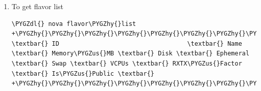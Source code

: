 \documentclass[letterpaper,10pt,english]{sphinxmanual}
\def\PYGZus{\char`\_}
\def\PYGZdl{\char`\$}
\def\PYGZhy{\char`\-}
\begin{document}
\begin{enumerate}
\item {} 
To get flavor list

\begin{Verbatim}[commandchars=\\\{\}]
\PYGZdl{} nova flavor\PYGZhy{}list
+\PYGZhy{}\PYGZhy{}\PYGZhy{}\PYGZhy{}\PYGZhy{}\PYGZhy{}\PYGZhy{}\PYGZhy{}\PYGZhy{}\PYGZhy{}\PYGZhy{}\PYGZhy{}\PYGZhy{}\PYGZhy{}\PYGZhy{}\PYGZhy{}\PYGZhy{}\PYGZhy{}\PYGZhy{}\PYGZhy{}\PYGZhy{}\PYGZhy{}\PYGZhy{}\PYGZhy{}\PYGZhy{}\PYGZhy{}\PYGZhy{}\PYGZhy{}\PYGZhy{}\PYGZhy{}\PYGZhy{}\PYGZhy{}\PYGZhy{}\PYGZhy{}\PYGZhy{}\PYGZhy{}\PYGZhy{}\PYGZhy{}+\PYGZhy{}\PYGZhy{}\PYGZhy{}\PYGZhy{}\PYGZhy{}\PYGZhy{}\PYGZhy{}\PYGZhy{}\PYGZhy{}\PYGZhy{}\PYGZhy{}\PYGZhy{}\PYGZhy{}\PYGZhy{}+\PYGZhy{}\PYGZhy{}\PYGZhy{}\PYGZhy{}\PYGZhy{}\PYGZhy{}\PYGZhy{}\PYGZhy{}\PYGZhy{}\PYGZhy{}\PYGZhy{}+\PYGZhy{}\PYGZhy{}\PYGZhy{}\PYGZhy{}\PYGZhy{}\PYGZhy{}+\PYGZhy{}\PYGZhy{}\PYGZhy{}\PYGZhy{}\PYGZhy{}\PYGZhy{}\PYGZhy{}\PYGZhy{}\PYGZhy{}\PYGZhy{}\PYGZhy{}+\PYGZhy{}\PYGZhy{}\PYGZhy{}\PYGZhy{}\PYGZhy{}\PYGZhy{}+\PYGZhy{}\PYGZhy{}\PYGZhy{}\PYGZhy{}\PYGZhy{}\PYGZhy{}\PYGZhy{}+\PYGZhy{}\PYGZhy{}\PYGZhy{}\PYGZhy{}\PYGZhy{}\PYGZhy{}\PYGZhy{}\PYGZhy{}\PYGZhy{}\PYGZhy{}\PYGZhy{}\PYGZhy{}\PYGZhy{}+\PYGZhy{}\PYGZhy{}\PYGZhy{}\PYGZhy{}\PYGZhy{}\PYGZhy{}\PYGZhy{}\PYGZhy{}\PYGZhy{}\PYGZhy{}\PYGZhy{}+
\textbar{} ID                                   \textbar{} Name         \textbar{} Memory\PYGZus{}MB \textbar{} Disk \textbar{} Ephemeral \textbar{} Swap \textbar{} VCPUs \textbar{} RXTX\PYGZus{}Factor \textbar{} Is\PYGZus{}Public \textbar{}
+\PYGZhy{}\PYGZhy{}\PYGZhy{}\PYGZhy{}\PYGZhy{}\PYGZhy{}\PYGZhy{}\PYGZhy{}\PYGZhy{}\PYGZhy{}\PYGZhy{}\PYGZhy{}\PYGZhy{}\PYGZhy{}\PYGZhy{}\PYGZhy{}\PYGZhy{}\PYGZhy{}\PYGZhy{}\PYGZhy{}\PYGZhy{}\PYGZhy{}\PYGZhy{}\PYGZhy{}\PYGZhy{}\PYGZhy{}\PYGZhy{}\PYGZhy{}\PYGZhy{}\PYGZhy{}\PYGZhy{}\PYGZhy{}\PYGZhy{}\PYGZhy{}\PYGZhy{}\PYGZhy{}\PYGZhy{}\PYGZhy{}+\PYGZhy{}\PYGZhy{}\PYGZhy{}\PYGZhy{}\PYGZhy{}\PYGZhy{}\PYGZhy{}\PYGZhy{}\PYGZhy{}\PYGZhy{}\PYGZhy{}\PYGZhy{}\PYGZhy{}\PYGZhy{}+\PYGZhy{}\PYGZhy{}\PYGZhy{}\PYGZhy{}\PYGZhy{}\PYGZhy{}\PYGZhy{}\PYGZhy{}\PYGZhy{}\PYGZhy{}\PYGZhy{}+\PYGZhy{}\PYGZhy{}\PYGZhy{}\PYGZhy{}\PYGZhy{}\PYGZhy{}+\PYGZhy{}\PYGZhy{}\PYGZhy{}\PYGZhy{}\PYGZhy{}\PYGZhy{}\PYGZhy{}\PYGZhy{}\PYGZhy{}\PYGZhy{}\PYGZhy{}+\PYGZhy{}\PYGZhy{}\PYGZhy{}\PYGZhy{}\PYGZhy{}\PYGZhy{}+\PYGZhy{}\PYGZhy{}\PYGZhy{}\PYGZhy{}\PYGZhy{}\PYGZhy{}\PYGZhy{}+\PYGZhy{}\PYGZhy{}\PYGZhy{}\PYGZhy{}\PYGZhy{}\PYGZhy{}\PYGZhy{}\PYGZhy{}\PYGZhy{}\PYGZhy{}\PYGZhy{}\PYGZhy{}\PYGZhy{}+\PYGZhy{}\PYGZhy{}\PYGZhy{}\PYGZhy{}\PYGZhy{}\PYGZhy{}\PYGZhy{}\PYGZhy{}\PYGZhy{}\PYGZhy{}\PYGZhy{}+

\end{Verbatim}
\end{enumerate}
\end{document}
